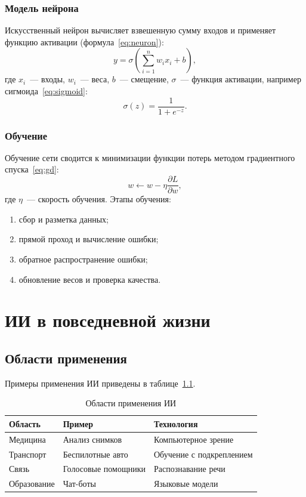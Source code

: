 \documentclass[14pt]{extreport}
\begin{document}
\subsection{Модель нейрона}
Искусственный нейрон вычисляет взвешенную сумму входов и применяет
функцию активации (формула~\eqref{eq:neuron}):
\begin{equation}
y = \sigma\left(\sum_{i=1}^{n} w_i x_i + b\right),
\label{eq:neuron}
\end{equation}
где $x_i$~--- входы, $w_i$~--- веса, $b$~--- смещение,
$\sigma$~--- функция активации, например сигмоида~\eqref{eq:sigmoid}:
\begin{equation}
\sigma(z) = \frac{1}{1 + e^{-z}}.
\label{eq:sigmoid}
\end{equation}

\subsection{Обучение}
Обучение сети сводится к минимизации функции потерь методом
градиентного спуска~\eqref{eq:gd}:
\begin{equation}
w \leftarrow w - \eta \frac{\partial L}{\partial w},
\label{eq:gd}
\end{equation}
где $\eta$~--- скорость обучения. Этапы обучения:
\begin{enumerate}
\item сбор и разметка данных;
\item прямой проход и вычисление ошибки;
\item обратное распространение ошибки;
\item обновление весов и проверка качества.
\end{enumerate}

\chapter{ИИ в повседневной жизни}
\section{Области применения}
Примеры применения ИИ приведены в таблице~\ref{tab:apps}.

\begin{table}[H]
\caption{Области применения ИИ}
\label{tab:apps}
\centering
\begin{tabular}{|l|l|l|}
\hline
\textbf{Область} & \textbf{Пример} & \textbf{Технология} \\
\hline
Медицина & Анализ снимков & Компьютерное зрение \\
\hline
Транспорт & Беспилотные авто & Обучение с подкреплением \\
\hline
Связь & Голосовые помощники & Распознавание речи \\
\hline
Образование & Чат-боты & Языковые модели \\
\hline
\end{tabular}
\end{table}
\end{document}
